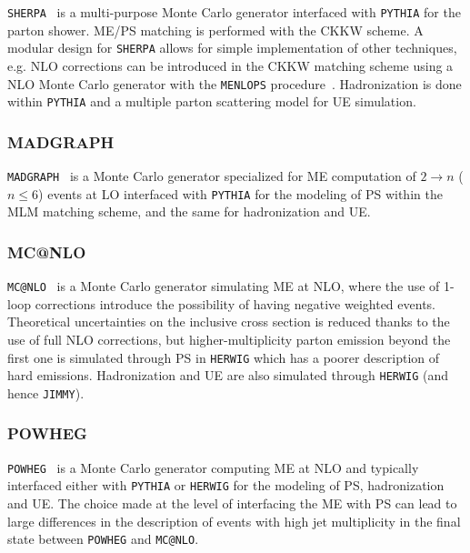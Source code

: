 \texttt{SHERPA}~\cite{sherpa} is a multi-purpose Monte Carlo generator
interfaced with \texttt{PYTHIA} for the parton shower. ME/PS matching
is performed with the CKKW scheme.
A modular design for \texttt{SHERPA} allows for  simple implementation
of other techniques, e.g. NLO corrections can be introduced in the
CKKW matching scheme using a NLO Monte Carlo generator with the
\texttt{MENLOPS} procedure~\cite{MENLOPS}.
Hadronization is done within \texttt{PYTHIA} and a multiple parton 
scattering model for UE simulation.


\subsubsection*{MADGRAPH}

\texttt{MADGRAPH}~\cite{madgraph} is a Monte Carlo generator 
specialized for ME computation of $2 \to n$ ($n\leq 6$) events at LO
interfaced with \texttt{PYTHIA} for the modeling of PS within the
MLM matching scheme, and the same for hadronization and UE.


\subsubsection*{MC@NLO}

\texttt{MC@NLO}~\cite{mcatnlo} is a Monte Carlo generator simulating ME at
NLO, where the use of 1-loop corrections introduce the possibility of having
negative weighted events. Theoretical uncertainties on the inclusive cross
section is reduced thanks to the use of full NLO corrections, but higher-multiplicity
parton emission beyond the first one is simulated through PS in \texttt{HERWIG} which has
a poorer description of hard emissions. 
Hadronization and UE are also simulated through \texttt{HERWIG}
(and hence \texttt{JIMMY}).

\subsubsection*{POWHEG}

\texttt{POWHEG}~\cite{powheg} is a Monte Carlo generator computing
ME at NLO and typically interfaced either with \texttt{PYTHIA} or 
\texttt{HERWIG} for the modeling of PS, hadronization and UE.
The choice made at the level of interfacing the ME with PS
can lead to large differences in the description of events with
 high jet multiplicity in the final state between \texttt{POWHEG} 
and \texttt{MC@NLO}.



